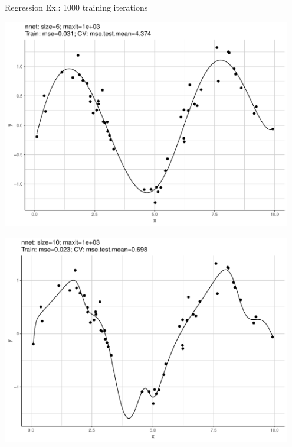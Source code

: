 \documentclass[11pt,compress,t,notes=noshow, xcolor=table]{beamer}
\begin{document}
\begin{vbframe}{Regression Ex.: 1000 training iterations}
\begin{knitrout}
{}




{\centering \includegraphics[width=0.95\textwidth]{figure/unnamed-chunk-5-6} 

}




{\centering \includegraphics[width=0.95\textwidth]{figure/unnamed-chunk-5-7} 

}



\end{knitrout}
\end{vbframe}
\end{document}
